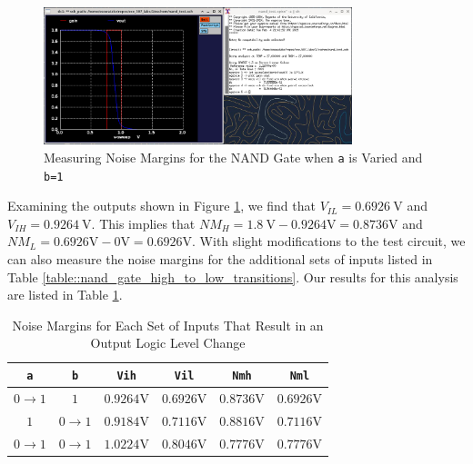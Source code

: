 \documentclass[fleqn]{article}
\begin{document}
	\begin{figure}[H]
		\centerline{\includegraphics[width=0.8\textwidth]{nand_noise_analysis_sweep_va.png}}
		\caption{Measuring Noise Margins for the NAND Gate when \texttt{a} is Varied and \texttt{b=1}}	\label{fig::nand_noise_analysis_sweep_va}
	\end{figure}
	
	Examining the outputs shown in Figure \ref{fig::nand_noise_analysis_sweep_va}, we find that $V_{IL} = 0.6926\ \text{V}$ and $V_{IH} = 0.9264\ \text{V}$. This implies that $NM_{H} = 1.8\ \text{V} - 0.9264 \text{V} = 0.8736 \text{V}$ and $NM_{L} = 0.6926 \text{V} - 0 \text{V} = 0.6926 \text{V}$. With slight modifications to the test circuit, we can also measure the noise margins for the additional sets of inputs listed in Table \ref{table::nand_gate_high_to_low_transitions}. Our results for this analysis are listed in Table \ref{table::nand_gate_noise_analysis}.
	
	\begin{table}[H]
	\begin{center}
	\caption{Noise Margins for Each Set of Inputs That Result in an Output Logic Level Change}
	\label{table::nand_gate_noise_analysis}
	\begin{tabular}{| c | c | c | c | c | c |}
		\hline
		\texttt{a} & \texttt{b} & \texttt{Vih} & \texttt{Vil} & \texttt{Nmh} & \texttt{Nml} \\
		\hline	
		$0 \rightarrow 1$ & $1$ & $0.9264 \text{V}$ & $0.6926 \text{V}$ & $0.8736 \text{V}$ & $0.6926 \text{V}$\\
		\hline	
		$1$ & $0 \rightarrow 1$ & $0.9184 \text{V}$ & $0.7116 \text{V}$ & $0.8816 \text{V}$ & $0.7116 \text{V}$\\
		\hline	
		$0 \rightarrow 1$ & $0 \rightarrow 1$ & $1.0224 \text{V}$ & $0.8046 \text{V}$ & $0.7776 \text{V}$ & $0.7776 \text{V}$\\
		\hline
	\end{tabular}
	\end{center}
	\end{table}
	
\end{document}
